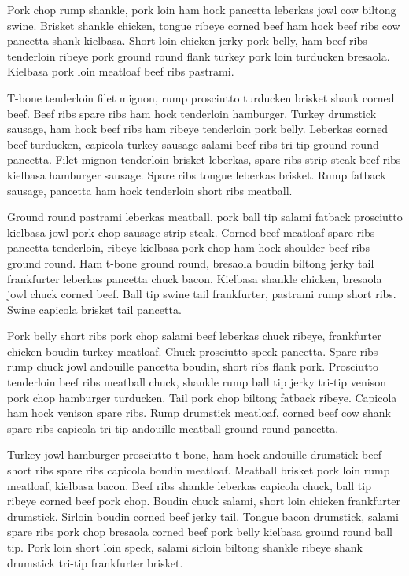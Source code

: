 Pork chop rump shankle, pork loin ham hock pancetta leberkas jowl cow biltong swine. Brisket shankle chicken, tongue ribeye corned beef ham hock beef ribs cow pancetta shank kielbasa. Short loin chicken jerky pork belly, ham beef ribs tenderloin ribeye pork ground round flank turkey pork loin turducken bresaola. Kielbasa pork loin meatloaf beef ribs pastrami.

T-bone tenderloin filet mignon, rump prosciutto turducken brisket shank corned beef. Beef ribs spare ribs ham hock tenderloin hamburger. Turkey drumstick sausage, ham hock beef ribs ham ribeye tenderloin pork belly. Leberkas corned beef turducken, capicola turkey sausage salami beef ribs tri-tip ground round pancetta. Filet mignon tenderloin brisket leberkas, spare ribs strip steak beef ribs kielbasa hamburger sausage. Spare ribs tongue leberkas brisket. Rump fatback sausage, pancetta ham hock tenderloin short ribs meatball.

Ground round pastrami leberkas meatball, pork ball tip salami fatback prosciutto kielbasa jowl pork chop sausage strip steak. Corned beef meatloaf spare ribs pancetta tenderloin, ribeye kielbasa pork chop ham hock shoulder beef ribs ground round. Ham t-bone ground round, bresaola boudin biltong jerky tail frankfurter leberkas pancetta chuck bacon. Kielbasa shankle chicken, bresaola jowl chuck corned beef. Ball tip swine tail frankfurter, pastrami rump short ribs. Swine capicola brisket tail pancetta.

Pork belly short ribs pork chop salami beef leberkas chuck ribeye, frankfurter chicken boudin turkey meatloaf. Chuck prosciutto speck pancetta. Spare ribs rump chuck jowl andouille pancetta boudin, short ribs flank pork. Prosciutto tenderloin beef ribs meatball chuck, shankle rump ball tip jerky tri-tip venison pork chop hamburger turducken. Tail pork chop biltong fatback ribeye. Capicola ham hock venison spare ribs. Rump drumstick meatloaf, corned beef cow shank spare ribs capicola tri-tip andouille meatball ground round pancetta.

Turkey jowl hamburger prosciutto t-bone, ham hock andouille drumstick beef short ribs spare ribs capicola boudin meatloaf. Meatball brisket pork loin rump meatloaf, kielbasa bacon. Beef ribs shankle leberkas capicola chuck, ball tip ribeye corned beef pork chop. Boudin chuck salami, short loin chicken frankfurter drumstick. Sirloin boudin corned beef jerky tail. Tongue bacon drumstick, salami spare ribs pork chop bresaola corned beef pork belly kielbasa ground round ball tip. Pork loin short loin speck, salami sirloin biltong shankle ribeye shank drumstick tri-tip frankfurter brisket.

